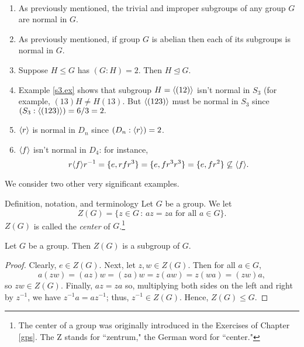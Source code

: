 \begin{example}{}\
\begin{enumerate}
\item As previously mentioned, the trivial and improper subgroups of
any group $G$ are normal in $G$.

\item As previously mentioned, if group $G$ is abelian then each of
its subgroups is normal in $G$.

\item Suppose $H\leq G$ has $(G:H)=2$.  Then $H \unlhd G$. 

\item Example \ref{s3.ex} shows that subgroup $H=\langle(12)\rangle$ isn't normal in
$S_3$ (for example, $(13)H\neq H(13)$.  But $\langle(123)\rangle$ must be
normal in $S_3$ since $(S_3:\langle(123)\rangle)=6/3=2.$

\item $\langle r\rangle$ is normal in $D_n$ since $(D_n:\langle r\rangle)=2$.

\item $\langle f\rangle$ isn't normal in $D_4$: for instance,
$$r\langle f\rangle r^{-1}=\{e,rfr^3\}=\{e, fr^3r^3\}=\{e,fr^2\}\not\subseteq
\langle f\rangle. $$
\end{enumerate}
\end{example}

 We consider two other very significant examples.


\begin{df}{Definition, notation, and terminology} Let $G$
be a group. We let $$Z(G)=\{z\in G\,:\, az=za \mbox{ for all }a\in
G\}.$$ $Z(G)$ is called the \textit{center} of $G$.\footnote{The center of a group was originally introduced in the Exercises of Chapter \ref{gps}. The Z stands for ``zentrum," the German word for ``center."}\end{df}

\begin{thm}\label{} Let $G$ be a group.  Then $Z(G)$ is a subgroup of $G$.
\end{thm}

\begin{proof}

 Clearly,
$e\in Z(G)$.  Next, let $z,w\in Z(G)$. Then for all $a \in G$,
$$a(zw)=(az)w=(za)w=z(aw)=z(wa)=(zw)a,$$ so $zw\in Z(G)$.  Finally, $az=za$ so, multiplying both
sides on the left and right by $z^{-1}$, we have $z^{-1}a=az^{-1}$;
thus, $z^{-1}\in Z(G)$.  Hence, $Z(G)\leq G$. \end{proof}

